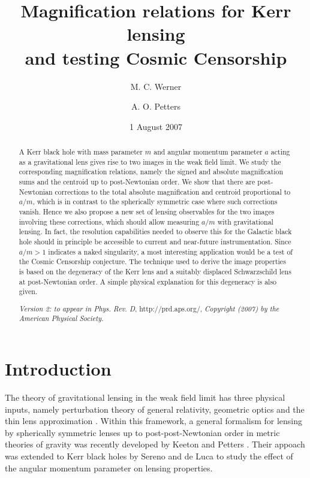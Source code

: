 \documentclass[prd,12pt,a4paper,showpacs]{revtex4}
\begin{document}
\title{Magnification relations for Kerr lensing \\ and testing Cosmic Censorship}

\author{M. C. Werner}

\author{A. O. Petters}

\date{1 August 2007}

\begin{abstract}
A Kerr black hole with mass parameter $m$ and angular momentum parameter $a$ 
acting as a gravitational lens gives rise to two images in the weak field limit. 
We study the corresponding magnification relations, namely the 
signed and absolute magnification sums and the centroid up to post-Newtonian order. 
We show that there are post-Newtonian corrections to the total 
absolute magnification and centroid proportional to $a/m$, 
which is in contrast to the spherically symmetric case where such corrections vanish. Hence 
we also propose a new set of lensing observables for the two images 
involving these corrections, which should allow measuring $a/m$ with gravitational lensing. In fact, the 
resolution capabilities needed to observe this for the Galactic black hole 
should in principle be accessible to current and near-future instrumentation. Since $a/m >1$ 
indicates a naked singularity, a most interesting application would be a test of the Cosmic Censorship 
conjecture. The technique used to derive the image properties is based on the degeneracy of 
the Kerr lens and a suitably displaced Schwarzschild lens at post-Newtonian order. 
A simple physical explanation for this degeneracy is also given.

\textit{Version 2: to appear in Phys. Rev. D}, http://prd.aps.org/, \textit{Copyright (2007) by the American Physical Society.}
\end{abstract}


\maketitle

\newpage

\section{Introduction}
The theory of gravitational lensing in the weak field limit has three 
physical inputs, namely perturbation theory of general relativity, 
geometric optics and the thin lens approximation \cite{schneider, petters}. 
Within this framework, a general formalism for lensing by spherically symmetric 
lenses up to post-post-Newtonian order in metric theories of gravity was 
recently developed by Keeton and Petters \cite{keeton1, keeton2}. 
Their appoach was extended to Kerr black holes by Sereno and 
de Luca \cite{sereno1} to study the effect of the angular momentum parameter 
on lensing properties.
 
\end{document}
